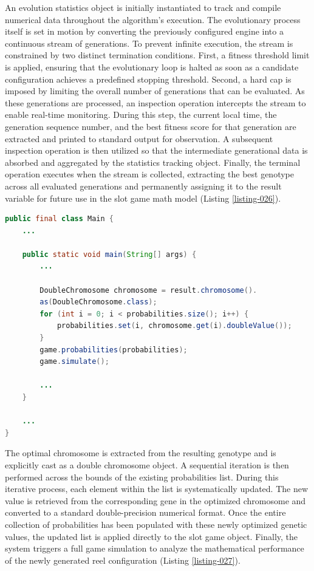\documentclass[12pt,twoside,openany]{book}
\begin{document}
An evolution statistics object is initially instantiated to track and compile numerical data throughout the algorithm's execution. The evolutionary process itself is set in motion by converting the previously configured engine into a continuous stream of generations. To prevent infinite execution, the stream is constrained by two distinct termination conditions. First, a fitness threshold limit is applied, ensuring that the evolutionary loop is halted as soon as a candidate configuration achieves a predefined stopping threshold. Second, a hard cap is imposed by limiting the overall number of generations that can be evaluated. As these generations are processed, an inspection operation intercepts the stream to enable real-time monitoring. During this step, the current local time, the generation sequence number, and the best fitness score for that generation are extracted and printed to standard output for observation. A subsequent inspection operation is then utilized so that the intermediate generational data is absorbed and aggregated by the statistics tracking object. Finally, the terminal operation executes when the stream is collected, extracting the best genotype across all evaluated generations and permanently assigning it to the result variable for future use in the slot game math model (Listing \ref{listing-026}).

\begin{lstlisting}[language=Java, caption={Simulate the result of the optimization}, label=listing-026]
public final class Main {
	...

    public static void main(String[] args) {
		...

        DoubleChromosome chromosome = result.chromosome().
        as(DoubleChromosome.class);
        for (int i = 0; i < probabilities.size(); i++) {
            probabilities.set(i, chromosome.get(i).doubleValue());
        }
        game.probabilities(probabilities);
        game.simulate();

		...
	}

	...
}
\end{lstlisting}

The optimal chromosome is extracted from the resulting genotype and is explicitly cast as a double chromosome object. A sequential iteration is then performed across the bounds of the existing probabilities list. During this iterative process, each element within the list is systematically updated. The new value is retrieved from the corresponding gene in the optimized chromosome and converted to a standard double-precision numerical format. Once the entire collection of probabilities has been populated with these newly optimized genetic values, the updated list is applied directly to the slot game object. Finally, the system triggers a full game simulation to analyze the mathematical performance of the newly generated reel configuration (Listing \ref{listing-027}).
\end{document}
